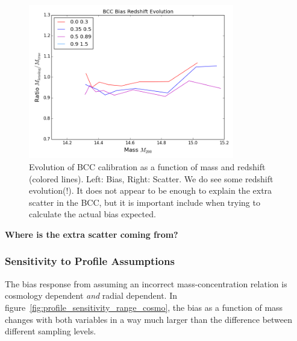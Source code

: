 \documentclass[11pt]{article}
\begin{document}
\begin{figure} \centering
\includegraphics[width=0.8\textwidth]{figures/bcc_bias_redshift_evo_r10_n0_0}
\caption{Evolution of BCC calibration as a function of mass and redshift (colored lines). Left: Bias, Right: Scatter. We do see some redshift evolution(!). It does not appear to be enough to explain the extra scatter in the BCC, but it is important include when trying to calculate the actual bias expected.}
\label{fig:bcc_bias_redshift_evo}
\end{figure}

\textbf{Where is the extra scatter coming from?}

\subsubsection{Sensitivity to Profile Assumptions}

The bias response from assuming an incorrect mass-concentration relation is cosmology dependent \emph{and} radial dependent. In figure~\ref{fig:profile_sensitivity_range_cosmo}, the bias as a function of mass changes with both variables in a way much larger than the difference between different sampling levels.
\end{document}
